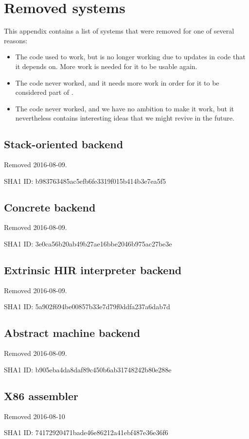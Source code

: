 \chapter{Removed systems}

This appendix contains a list of systems that were removed for one of
several reasons:

\begin{itemize}
\item The code used to work, but is no longer working due to updates
  in code that it depends on.  More work is needed for it to be usable
  again.
\item The code never worked, and it needs more work in order for it to
  be considered part of \sysname{}.
\item The code never worked, and we have no ambition to make it work,
  but it nevertheless contains interesting ideas that we might revive
  in the future.
\end{itemize}

\section{Stack-oriented \clanguage{} backend}

Removed 2016-08-09.

SHA1 ID: b983763485ac5efb6fe3319f015b414b3e7ea5f5

\section{Concrete \commonlisp{} backend}

Removed 2016-08-09.

SHA1 ID: 3e0ca56b20ab49b27ae16bbe2046b975ac27be3e

\section{Extrinsic HIR interpreter backend}

Removed 2016-08-09.

SHA1 ID: 5a902f694be00857b33e7d79f0ddfa237a6dab7d

\section{Abstract machine backend}

Removed 2016-08-09.

SHA1 ID: b905eba4da8daf89c450b6ab31748242b80e288e

\section{X86 assembler}

Removed 2016-08-10

SHA1 ID: 74172920471bade46e86212a41ebf487e36e36f6
